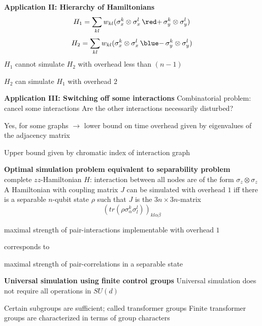 \documentclass[portrait]{seminar}
\begin{document}
\begin{slide}
{\large {\bf Application II: Hierarchy of Hamiltonians}}
\vfill
\[
H_1 = \sum_{kl} w_{kl} 
(\sigma^k_x\otimes\sigma^l_x\, {\red +}\, \sigma^k_y\otimes\sigma^l_y)
\]
\[
H_2 = \sum_{kl} w_{kl} 
(\sigma^k_x\otimes\sigma^l_x\, {\blue -}\, \sigma^k_y\otimes\sigma^l_y)
\]
\vfill
$H_1$ cannot simulate $H_2$ with overhead less than $(n-1)$

$H_2$ can simulate $H_1$ with overhead $2$
\vfill
\end{slide}

\begin{slide}
{\large {\bf Application III: Switching off {\red some} interactions}}
\vfill
Combinatorial problem: cancel some interactions
\vfill
Are the other interactions necessarily disturbed?
\begin{figure}
\centerline{
}
\end{figure}
\vfill 
Yes, for some graphs $\rightarrow$ lower bound on time overhead
given by eigenvalues of the adjacency matrix \vfill

Upper bound given by chromatic index of interaction graph
\end{slide}

\begin{slide}
{\bf Optimal simulation problem equivalent to separability problem}
\vfill
complete $zz$-Hamiltonian $H$: interaction between all nodes are of the
form $\sigma_z\otimes \sigma_z$
\vfill
A Hamiltonian with coupling matrix $J$ can be simulated with overhead 
$1$ iff there is a separable $n$-qubit state $\rho$ such that $J$ is the
$3n\times 3n$-matrix
\[
\left( tr(\rho\sigma_\alpha^k\sigma_l^l)\right)_{kl\alpha\beta}
\]
\vfill
\begin{center}
{\blue maximal strength of pair-interactions implementable with overhead $1$}

corresponds to

{\blue maximal strength of pair-correlations in a separable state}
\end{center}
\vfill
\end{slide}

\begin{slide}
{\large {\bf Universal simulation using finite control groups}}
\vfill
{\blue Universal simulation} does not require all operations in $SU(d)$

Certain subgroups are sufficient; called {\blue transformer groups}
\vfill 
{\blue Finite transformer groups are characterized in terms of group 
characters} 
\vfill
\end{slide}
\end{document}
